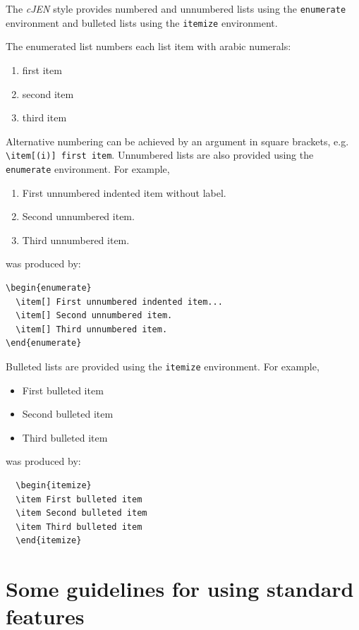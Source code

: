 \documentclass[]{cJEN2e}
\begin{document}
The {\it cJEN} style provides numbered and unnumbered lists using the {\tt enumerate} environment and bulleted
lists  using the {\tt itemize} environment.

The enumerated list numbers each list item with arabic numerals:
%
\begin{enumerate}
   \item first item
   \item second item
   \item third item
\end{enumerate}
%
Alternative numbering can be achieved by an argument in square brackets, e.g. \verb"\item[(i)] first item".
%
Unnumbered lists are also provided using the {\tt enumerate} environment.
For example,
\begin{enumerate}
   \item[] First unnumbered indented item without label.
   \item[] Second unnumbered item.
   \item[] Third unnumbered item.
\end{enumerate}
was produced by:
%
\begin{verbatim}
\begin{enumerate}
  \item[] First unnumbered indented item...
  \item[] Second unnumbered item.
  \item[] Third unnumbered item.
\end{enumerate}
\end{verbatim}
%
Bulleted lists are provided using the {\tt itemize} environment. For example,
\begin{itemize}
\item First bulleted item
\item Second bulleted item
\item Third bulleted item
\end{itemize}
was produced by:
\begin{verbatim}
  \begin{itemize}
  \item First bulleted item
  \item Second bulleted item
  \item Third bulleted item
  \end{itemize}
\end{verbatim}


\section[]{Some guidelines for using standard features}
\end{document}
